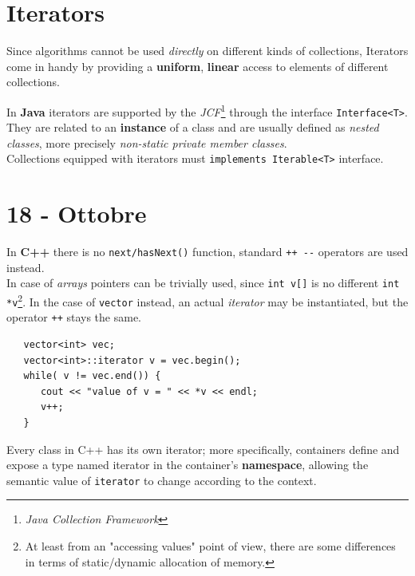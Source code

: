 \section{Iterators}
Since algorithms cannot be used \textit{directly} on different kinds of collections,
Iterators come in handy by providing a \textbf{uniform}, \textbf{linear} access to elements of different collections.

In \textbf{Java} iterators are supported by the \textit{JCF}\footnote{\textit{Java Collection Framework}} through the interface \lstinline|Interface<T>|.
They are related to an \textbf{instance} of a class and are usually defined as \textit{nested classes},
more precisely \textit{non-static private member classes}.\\
Collections equipped with iterators must \lstinline|implements Iterable<T>| interface.

\section*{18 - Ottobre}

In \textbf{C++} there is no \lstinline|next/hasNext()| function, standard \lstinline|++ --| operators are used instead.\\
\lstset{language=C++}
In case of \textit{arrays} pointers can be trivially used,
since \lstinline|int v[]| is no different \lstinline|int *v|\footnote{At least from an "accessing values" point of view, there are some differences in terms of static/dynamic allocation of memory.}.
In the case of \lstinline|vector| instead, an actual \textit{iterator} may be instantiated,
but the operator \lstinline|++| stays the same.
\begin{lstlisting}
   vector<int> vec;
   vector<int>::iterator v = vec.begin();
   while( v != vec.end()) {
      cout << "value of v = " << *v << endl;
      v++;
   }
\end{lstlisting}

Every class in C++ has its own iterator;
more specifically, containers define and expose a type named iterator in the container's \textbf{namespace},
allowing the semantic value of \lstinline|iterator| to change according to the context.

